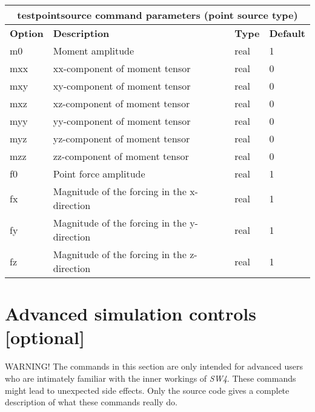 \documentclass[11pt]{report}
\begin{document}
\begin{center}
\begin{tabular}{|l|p{8cm}|l|l|} \hline
\multicolumn{4}{|c|}{\bf testpointsource command parameters (point source type)}\\ \hline
\bf{Option} & \bf{Description} & \bf{Type} & \bf{Default} \\ \hline \hline
m0   & Moment amplitude & real & 1 \\ \hline
mxx  & xx-component of moment tensor & real & 0 \\ \hline
mxy  & xy-component of moment tensor & real & 0 \\ \hline
mxz  & xz-component of moment tensor & real & 0 \\ \hline
myy  & yy-component of moment tensor & real & 0 \\ \hline
myz  & yz-component of moment tensor & real & 0 \\ \hline
mzz  & zz-component of moment tensor & real & 0 \\ \hline
\hline
f0   & Point force amplitude                       & real & 1\\ \hline 
fx   & Magnitude of the forcing in the x-direction & real & 1 \\ \hline
fy   & Magnitude of the forcing in the y-direction & real & 1 \\ \hline
fz   & Magnitude of the forcing in the z-direction & real & 1 \\ \hline
\end{tabular}
\end{center}

\section{Advanced simulation controls [optional]}

WARNING! The commands in this section are only intended for advanced users who are intimately
familiar with the inner workings of \emph{SW4}. These commands might lead to unexpected side
effects. Only the source code gives a complete description of what these commands really do.
\end{document}
